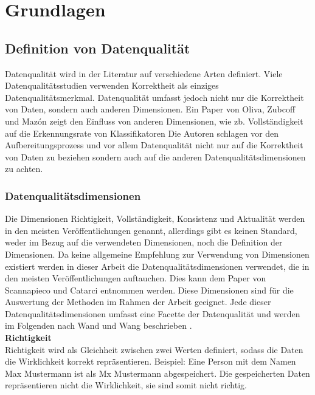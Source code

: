 \chapter{Grundlagen}\label{ch:data}

\section{Definition von Datenqualität}
Datenqualität wird in der Literatur auf verschiedene Arten definiert. 
Viele Datenqualitätsstudien verwenden Korrektheit als einziges Datenqualitätsmerkmal. \cite{wang1996}
Datenqualität umfasst jedoch nicht nur die Korrektheit von Daten, sondern auch anderen Dimensionen. 
Ein Paper von Oliva, Zubcoff und Mazón zeigt den Einfluss von anderen Dimensionen, wie zb. Vollständigkeit auf die Erkennungsrate von Klassifikatoren \cite{espinosaoliva2011} Die Autoren schlagen vor den Aufbereitungsprozess und vor allem Datenqualität nicht nur auf die Korrektheit von Daten zu beziehen sondern auch auf die anderen Datenqualitätsdimensionen zu achten.

\subsection{Datenqualitätsdimensionen}
Die Dimensionen Richtigkeit, Vollständigkeit, Konsistenz und Aktualität werden in den meisten Veröffentlichungen genannt, allerdings gibt es keinen Standard, weder im Bezug auf die verwendeten Dimensionen, noch die Definition der Dimensionen. \cite{scannapieco2002}
Da keine allgemeine Empfehlung zur Verwendung von Dimensionen existiert werden in dieser Arbeit die Datenqualitätsdimensionen verwendet, die in den meisten Veröffentlichungen auftauchen.
Dies kann dem Paper von Scannapieco und Catarci entnommen werden. 
Diese Dimensionen sind für die Auswertung der Methoden im Rahmen der Arbeit geeignet. 
Jede dieser Datenqualitätsdimensionen umfasst eine Facette der Datenqualität und werden im Folgenden nach Wand und Wang beschrieben \cite{wand1996}. \\

\textbf{Richtigkeit} \\
Richtigkeit wird als Gleichheit zwischen zwei Werten definiert, sodass die Daten die Wirklichkeit korrekt repräsentieren. 
Beispiel: Eine Person mit dem Namen Max Mustermann ist als Mx Mustermann abgespeichert. 
Die gespeicherten Daten repräsentieren nicht die Wirklichkeit, sie sind somit nicht richtig. \\

